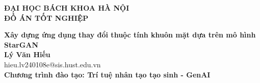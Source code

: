 \documentclass[DoAn.tex]{subfiles}
\begin{document}
\begin{titlepage}
\thispagestyle{empty}
\begin{center}

{\textbf{\large{ĐẠI HỌC BÁCH KHOA HÀ NỘI}}}\\[4cm]

{\textbf{\huge{ ĐỒ ÁN TỐT NGHIỆP}}}\\[1cm]
{\textbf{\Large{Xây dựng ứng dụng thay đổi thuộc tính khuôn mặt dựa trên mô hình StarGAN}}\\[1cm]

{\textbf{\large{Lý Văn Hiếu}}}\\
{\large{hieu.lv240108e@sis.hust.edu.vn}}\\[0.5cm]

{\textbf{\large{Chương trình đào tạo: Trí tuệ nhân tạo tạo sinh - GenAI}}}\\

\vspace{3cm}
\begin{table}[H]
\centering
{}
\end{table}}
\end{center}



\end{titlepage}
\end{document}
